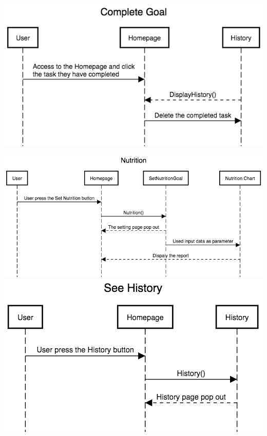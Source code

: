 \documentclass[a4paper]{article}
\begin{document}
\newline
\newline
\newline
\includegraphics[width=\textwidth, height=8cm]{Complete_Goal.png}
\newline
\newline
\newline
\includegraphics[width=\textwidth, height=8 cm]{Nutrition.png}
\newline
\newline
\newline
\includegraphics[width=\textwidth, height=8 cm]{See_History.png}
\newline
\end{document}
